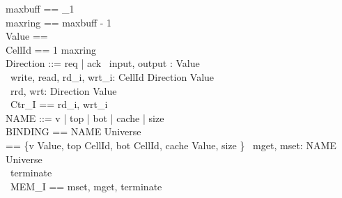\documentclass[10pt]{article}
\begin{document}
\begin{circus}
    [Universe]
    \also maxbuff == \nat_1 \\
    \also maxring == maxbuff - 1 \\
    \also Value == \nat \\
    \also CellId == 1 \upto maxring \\
    \also Direction ::=  req | ack
    \also \circchannel\ input, output : Value \\
    \also \circchannel\ write, read, rd\_i, wrt\_i: CellId \cross Direction \cross Value \\
    \also \circchannel\ rrd, wrt: Direction \cross Value \\
    \also \circchannelset\ Ctr\_I == \lchanset rd\_i, wrt\_i \rchanset \\
    \also NAME ::= v | top | bot | cache | size \\
    \also BINDING == NAME \fun Universe \\
    \also \delta == \{v \mapsto Value, top \mapsto CellId, bot \mapsto CellId, cache \mapsto Value, size \mapsto \nat \}
    \also \circchannel\ mget, mset: NAME \cross Universe \\
    \also \circchannel\ terminate \\
    \also \circchannelset\ MEM\_I == \lchanset mset, mget, terminate \rchanset \\
\end{circus}%
\end{document}
